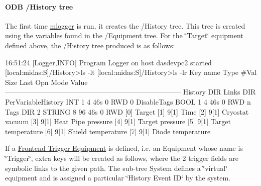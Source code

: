 \par
 

 \par
 \label{F_History_logging_idx_history_ODB-tree}
\hypertarget{F_History_logging_idx_history_ODB-tree}{}
 \label{F_History_logging_idx_ODB_tree_History}
\hypertarget{F_History_logging_idx_ODB_tree_History}{}
\hypertarget{F_History_logging_F_ODB_History_tree}{}\paragraph{ODB /History tree}\label{F_History_logging_F_ODB_History_tree}
\label{F_History_logging_idx_logger_utility_mlogger}
\hypertarget{F_History_logging_idx_logger_utility_mlogger}{}
 The first time \hyperlink{F_Logging_F_mlogger_utility}{mlogger} is run, it creates the /History  tree. This tree is created using the variables found in the /Equipment tree. For the \char`\"{}Target\char`\"{} equipment defined above, the /History tree produced is as follows:


\begin{DoxyCode}
16:51:24 [Logger,INFO] Program Logger on host dasdevpc2 started
[local:midas:S]/History>ls -lt
[local:midas:S]/History>ls -lr
Key name                        Type    #Val  Size  Last Opn Mode Value
---------------------------------------------------------------------------
History                         DIR
    Links                       DIR
    PerVariableHistory          INT     1     4     46s  0   RWD  0
    DisableTags                 BOOL    1     4     46s  0   RWD  n
    Tags                        DIR
        2                       STRING  8     96    46s  0   RWD
                                        [0]             Target
                                        [1]             9[1] Time
                                        [2]             9[1] Cryostat vacuum
                                        [3]             9[1] Heat Pipe pressure
                                        [4]             9[1] Target pressure
                                        [5]             9[1] Target temperature
                                        [6]             9[1] Shield temperature
                                        [7]             9[1] Diode temperature
\end{DoxyCode}


If a \hyperlink{FE_eqdec}{Frontend Trigger Equipment} is defined, i.e. an Equipment whose name is \char`\"{}Trigger\char`\"{}, extra keys will be created as follows, where the 2 trigger fields are symbolic links to the given path. The sub-\/tree System defines a \char`\"{}virtual\char`\"{} equipment and is assigned a particular \char`\"{}History Event ID\char`\"{} by the system.


